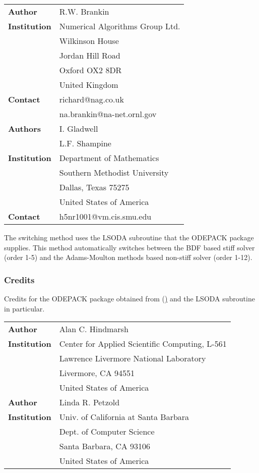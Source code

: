 \vspace{0.5cm}
\begin{tabular}{ l l }
 \textbf{Author}      & R.W. Brankin \\
 \textbf{Institution} & Numerical Algorithms Group Ltd. \\
                      & Wilkinson House \\
                      & Jordan Hill Road \\
                      & Oxford OX2 8DR \\
                      & United Kingdom \\
 \textbf{Contact}     & richard@nag.co.uk \\
                      & na.brankin@na-net.ornl.gov \\
 \textbf{Authors}     & I. Gladwell \\
                      & L.F. Shampine \\
 \textbf{Institution} & Department of Mathematics \\
                      & Southern Methodist University \\
                      & Dallas, Texas 75275 \\
                      & United States of America \\
 \textbf{Contact}     & h5nr1001@vm.cis.smu.edu \\
\end{tabular}
\label{subsec:LSODA}
The switching method uses the LSODA subroutine that the ODEPACK package supplies. This method automatically switches between the BDF based stiff solver (order 1-5) and the Adams-Moulton methods based non-stiff solver (order 1-12).

\subsubsection{Credits}
Credits for the ODEPACK package obtained from (\hyperlink{http://www.netlib.org/}) and the LSODA subroutine in particular.

\vspace{0.5cm}
\begin{tabular}{ l l }
 \textbf{Author}      & Alan C. Hindmarsh \\
 \textbf{Institution} & Center for Applied Scientific Computing, L-561 \\
                      & Lawrence Livermore National Laboratory \\
                      & Livermore, CA 94551 \\
                      & United States of America \\
 \textbf{Author}      & Linda R. Petzold \\
 \textbf{Institution} & Univ. of California at Santa Barbara \\
                      & Dept. of Computer Science \\
                      & Santa Barbara, CA 93106 \\
                      & United States of America \\
\end{tabular}

